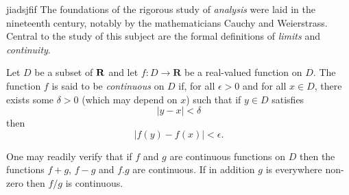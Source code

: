 \documentclass[a4paper,12pt]{article}
\begin{document}
jiadsjfif The foundations of the rigorous study of \emph{analysis}
were laid in the nineteenth century, notably by the
mathematicians Cauchy and Weierstrass. Central to the
study of this subject are the formal definitions of
\emph{limits} and \emph{continuity}.

Let $D$ be a subset of $\bf R$ and let
$f \colon D \to \mathbf{R}$ be a real-valued function on
$D$. The function $f$ is said to be \emph{continuous} on
$D$ if, for all $\epsilon > 0$ and for all $x \in D$,
there exists some $\delta > 0$ (which may depend on $x$)
such that if $y \in D$ satisfies
\[ |y - x| < \delta \]
then
\[ |f(y) - f(x)| < \epsilon. \]

One may readily verify that if $f$ and $g$ are continuous
functions on $D$ then the functions $f+g$, $f-g$ and
$f.g$ are continuous. If in addition $g$ is everywhere
non-zero then $f/g$ is continuous.
\end{document}
